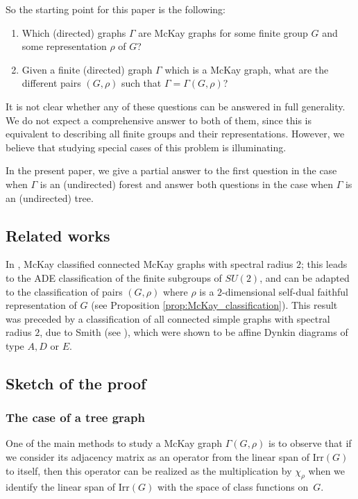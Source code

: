 So the starting point for this paper is the following:

\pagebreak

\begin{problem}
\mbox{}
\begin{enumerate}
    \item Which (directed) graphs $\Gamma$ are McKay graphs for some finite group $G$ and some representation $\rho$ of $G$? 
    \item Given a finite (directed) graph $\Gamma$ which is a McKay graph, what are the different pairs $(G,\rho)$ such that $\Gamma=\Gamma(G,\rho)$?      
\end{enumerate}
\end{problem}
It is not clear whether any of these questions can be answered in full generality. We do not expect a comprehensive answer to both of them, since this is equivalent to describing all finite groups and their representations. However, we believe that studying special cases of this problem is illuminating. 

In the present paper, we {give a partial} answer {to} the first question in the case when $\Gamma$ is an (undirected) forest and {answer both questions} in the case when $\Gamma$ is an (undirected) tree.

\subsection{Related works}\label{ssec:intro_rel_works}
In \cite{McKay}, McKay classified {connected} McKay graphs with spectral radius $2$; this leads to the ADE classification of the finite subgroups of $SU(2)$, and can be adapted to the classification of pairs $(G,\rho)$ where $\rho$ is a $2$-dimensional self-dual faithful representation of $G$ (see Proposition \ref{prop:McKay_classification}). {This result was preceded by a classification of all connected simple graphs with spectral radius $2$, due to Smith (see \cite{Smith}), which were shown to be affine Dynkin diagrams of type $A, D$ or $E$.}

\subsection{Sketch of the proof}

\subsubsection{The case of a tree graph}
One of the main methods to study a McKay graph $\Gamma(G,\rho)$ is to observe that if we consider its adjacency matrix as an operator from the linear span of $\mathrm{Irr}(G)$ to itself, then this operator can be realized as the multiplication by $\chi_\rho$ when we identify the linear span of $\mathrm{Irr}(G)$ with the space of class functions on~$G$.

